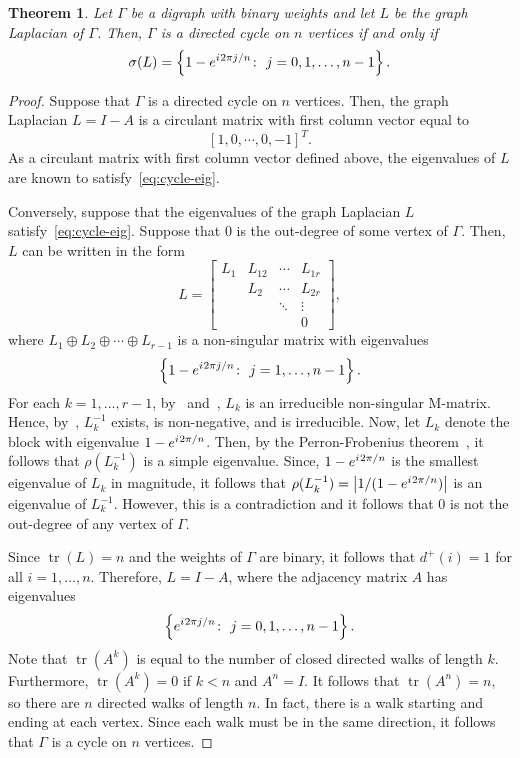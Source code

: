 \documentclass{article}
\newtheorem{theorem}{Theorem}[section]
\theoremstyle{definition}
\newcommand{\iu}{{i\mkern1mu}}
\newcommand\abs[1]{\left|#1\right|}
\newcommand\tr[1]{\operatorname{tr}\left(#1\right)}
\begin{document}
\begin{theorem}
Let $\Gamma$ be a digraph with binary weights and let $L$ be the graph Laplacian of $\Gamma$.
Then, $\Gamma$ is a directed cycle on $n$ vertices if and only if
\begin{equation}\label{eq:cycle-eig}
\sigma(L)=\left\{1-e^{\iu 2\pi j/n}\colon~j=0,1,\ldots,n-1\right\}.
\end{equation}
\end{theorem}
\begin{proof}
Suppose that $\Gamma$ is a directed cycle on $n$ vertices. 
Then, the graph Laplacian $L=I-A$ is a circulant matrix with first column vector equal to
\[
[1,0,\cdots,0,-1]^{T}.
\]
As a circulant matrix with first column vector defined above, the eigenvalues of $L$ are known to satisfy~\eqref{eq:cycle-eig}. 

Conversely, suppose that the eigenvalues of the graph Laplacian $L$ satisfy~\eqref{eq:cycle-eig}.
Suppose that $0$ is the out-degree of some vertex of $\Gamma$.
Then, $L$ can be written in the form
\[
L=\begin{bmatrix} L_{1} & L_{12} & \cdots & L_{1r} \\ & L_{2} & \cdots & L_{2r} \\ & & \ddots & \vdots \\ & & & 0 \end{bmatrix},
\]
where $L_{1}\oplus L_{2}\oplus\cdots\oplus L_{r-1}$ is a non-singular matrix with eigenvalues 
\[
\left\{1-e^{\iu 2\pi j/n}\colon~j=1,\ldots,n-1\right\}.
\]
For each $k=1,\ldots,r-1$, by~\cite[Lemma 6.4.1]{Berman1994} and~\cite[Theorem 6.2.3 (M35)]{Berman1994}, $L_{k}$ is an irreducible non-singular M-matrix. 
Hence, by~\cite[Theorem 6.2.3 (N38)]{Berman1994}, $L_{k}^{-1}$ exists, is non-negative, and is irreducible.
Now, let $L_{k}$ denote the block with eigenvalue $1-e^{\iu 2\pi/n}$.
Then, by the Perron-Frobenius theorem~\cite[Theorem 2.1.4]{Berman1994}, it follows that $\rho(L_{k}^{-1})$ is a simple eigenvalue.
Since, $1-e^{\iu 2\pi/n}$ is the smallest eigenvalue of $L_{k}$ in magnitude, it follows that $\rho(L_{k}^{-1})=\abs{1/(1-e^{\iu 2\pi/n})}$ is an eigenvalue of $L_{k}^{-1}$. 
However, this is a contradiction and it follows that $0$ is not the out-degree of any vertex of $\Gamma$.

Since $\tr{L}=n$ and the weights of $\Gamma$ are binary, it follows that $d^{+}(i)=1$ for all $i=1,\ldots,n$.
Therefore, $L=I-A$, where the adjacency matrix $A$ has eigenvalues
\[
\left\{e^{\iu 2\pi j/n}\colon~j=0,1,\ldots,n-1\right\}.
\]
Note that $\tr{A^{k}}$ is equal to the number of closed directed walks of length $k$.
Furthermore, $\tr{A^{k}}=0$ if $k<n$ and $A^{n}=I$.
It follows that $\tr{A^{n}}=n$, so there are $n$ directed walks of length $n$.
In fact, there is a walk starting and ending at each vertex.
Since each walk must be in the same direction, it follows that $\Gamma$ is a cycle on $n$ vertices. 
\end{proof}
\end{document}
